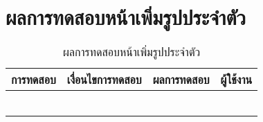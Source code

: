 \section{ผลการทดสอบหน้าเพิ่มรูปประจำตัว}
\begin{table}[H]
	\caption{ผลการทดสอบหน้าเพิ่มรูปประจำตัว}
    \centering	
	\label{tab:test4}
    \begin{tabular}{ | p{4cm} | p{4cm} | p{4cm} | p{2cm} | }
		\hline
	\multicolumn{1}{|c|}{การทดสอบ} & \multicolumn{1}{c|}{เงื่อนไขการทดสอบ} & \multicolumn{1}{c|}{ผลการทดสอบ} & \multicolumn{1}{c|}{ผู้ใช้งาน}                             \\ \hline
	\setstretch{1.0}{ทดสอบหน้าเพิ่มรูปประจำตัว}
	& \setstretch{1.0}{ผู้ใช้เข้ามาในหน้าเพิ่มรูปประจำตัว}
	& \setstretch{1.0}{ระบบแสดงหน้าเพิ่มรูปประจำตัว} 
	&\setstretch{1.0}{\begin{flushleft}ผู้ใช้งาน\end{flushleft}} \\ \cline{2-3} 
	& \setstretch{1.0}{ผู้ใช้กดเปลี่ยนรูปประจำตัว} 
	& \setstretch{1.0}{ระบบแสดงเมนูเปลี่ยนรูปประจำตัว 2 แบบได้แก่ ถ่ายรูป เลือกจากแกลลอรี่} 
	&\setstretch{1.0}{}\\ \cline{2-3} 
	& \setstretch{1.0}{ผู้ใช้เปลี่ยนรูปประจำตัวด้วยการถ่ายรูป}  
	& \setstretch{1.0}{ระบบจะบันทึกรูปที่ได้จากการถ่ายรูปและไปหน้าเพิ่มชื่อเล่น} 
	&\setstretch{1.0}{}\\ \cline{2-3} \hline
	& \setstretch{1.0}{ผู้ใช้เปลี่ยนรูปประจำตัวด้วยการเลือกจากแกลลอรี่}  
	& \setstretch{1.0}{ระบบจะบันทึกรูปที่ได้จากการเลือกจากแกลลอรี่และไปหน้าเพิ่มชื่อเล่น} 
	&\setstretch{1.0}{}\\ \cline{2-3} \hline
	&\setstretch{1.0}{}\\ \cline{2-3} \hline
	& \setstretch{1.0}{ผู้ใช้ไม่เลือกเปลี่ยนรูปประจำตัว}  
	& \setstretch{1.0}{ระบบบันทึกรูปพื้นฐานของระบบและไปหน้าเพิ่มชื่อเล่น} 
	&\setstretch{1.0}{}\\ \cline{2-3} \hline
    \end{tabular}
\end{table}

